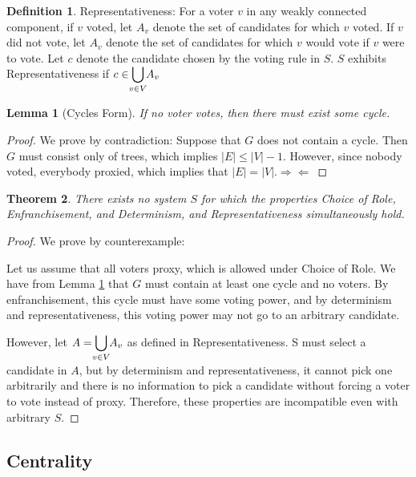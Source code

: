 \documentclass[10pt]{article}
\newtheorem{theorem}{Theorem}[section]
\newtheorem{lemma}[theorem]{Lemma}
\theoremstyle{definition}
\newtheorem{definition}{Definition}[section]
\begin{document}
\theoremstyle{definition}
\begin{definition}{Representativeness:}
For a voter $v$ in any weakly connected component, if $v$ voted, let $A_v$ denote the set of candidates for which $v$ voted. If $v$ did not vote, let $A_v$ denote the set of candidates for which $v$ would vote if $v$ were to vote. Let $c$ denote the candidate chosen by the voting rule in $S$. $S$ exhibits Representativeness if $c \in \smashoperator{\bigcup\limits_{v \in V}}A_v$ 
\end{definition}

\begin{lemma}[Cycles Form]
\label{cyclesform}
If no voter votes, then there must exist some cycle.
\end{lemma}
\begin{proof}
We prove by contradiction:
Suppose that $G$ does not contain a cycle. Then $G$ must consist only of trees, which implies $|E| \leq |V| -1$. However, since nobody voted, everybody proxied, which implies that $|E| = |V|. \Rightarrow\Leftarrow$
\end{proof}

\begin{theorem} 
\label{CFLIT}
There exists no system $S$ for which the properties Choice of Role, Enfranchisement, and Determinism, and Representativeness simultaneously hold.
\end{theorem}
\begin{proof} We prove by counterexample:

Let us assume that all voters proxy, which is allowed under Choice of Role. We have from Lemma \ref{cyclesform} that $G$ must contain at least one cycle and no voters. By enfranchisement, this cycle must have some voting power, and by determinism and representativeness, this voting power may not go to an arbitrary candidate. 

However, let $A = \smashoperator{\bigcup\limits_{v \in V}}A_v$ as defined in Representativeness. S must select a candidate in $A$, but by determinism and representativeness, it cannot pick one arbitrarily and there is no information to pick a candidate without forcing a voter to vote instead of proxy. Therefore, these properties are incompatible even with arbitrary $S$.

\end{proof}

\subsection{Centrality}
\end{document}
